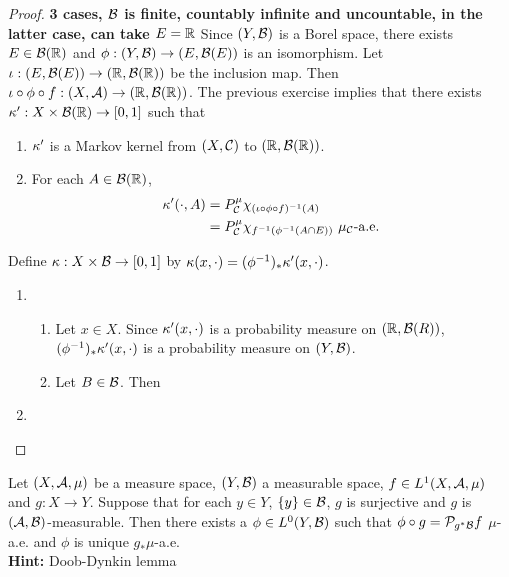 \documentclass{book}
\begin{document}
	\begin{proof} \textbf{3 cases, $\mathcal{B}$ is finite, countably infinite and uncountable, in the latter case, can take $E = \mathbb{R}$}
		Since $(Y, \mathcal{B})$ is a Borel space, there exists $E \in \mathcal{B}(\mathbb{R})$ and $\phi: (Y, \mathcal{B}) \rightarrow (E, \mathcal{B}(E) )$ is an isomorphism. Let $\iota: (E, \mathcal{B}(E)) \rightarrow (\mathbb{R}, \mathcal{B}(\mathbb{R}))$ be the inclusion map. Then $\iota \circ \phi \circ f : (X, \mathcal{A}) \rightarrow (\mathbb{R}, \mathcal{B}(\mathbb{R}))$. The previous exercise implies that there exists $\kappa': X \times \mathcal{B}(\mathbb{R}) \rightarrow [0,1]$ such that  	
		\begin{enumerate}
			\item $\kappa'$ is a Markov kernel from $(X, \mathcal{C})$ to $(\mathbb{R}, \mathcal{B}(\mathbb{R}))$.
			\item For each $A \in \mathcal{B}(\mathbb{R})$,  
			\begin{align*}
				\kappa'(\cdot, A) 
				& = P^{\mu}_{\mathcal{C}}\chi_{(\iota \circ \phi \circ f)^{-1}(A)} \\
				& = P^{\mu}_{\mathcal{C}}\chi_{f^{-1}(\phi^{-1}(A \cap E))} \text{ $\mu_{\mathcal{C}}$-a.e.}\\
			\end{align*}
		\end{enumerate}
		Define $\kappa: X \times \mathcal{B} \rightarrow [0,1]$ by $\kappa(x, \cdot) = (\phi^{-1})_*\kappa'(x, \cdot)$. 
		\begin{enumerate}
			\item
			\begin{enumerate}
				\item  Let $x \in X$. Since $\kappa'(x, \cdot)$ is a probability measure on $(\mathbb{R}, \mathcal{B}(R))$, $(\phi^{-1})_*\kappa'(x, \cdot)$ is a probability measure on $(Y, \mathcal{B})$.
				\item Let $B \in \mathcal{B}$. Then 
			\end{enumerate}
			\item 
		\end{enumerate}
	\end{proof}
	
	\begin{ex} 
		Let $(X, \mathcal{A}, \mu)$ be a measure space, $(Y, \mathcal{B})$ a measurable space, $f \in L^1(X, \mathcal{A}, \mu)$ and $g: X \rightarrow Y$. Suppose that for each $y \in Y$, $\{y\} \in \mathcal{B}$, $g$ is surjective and $g$ is $(\mathcal{A}, \mathcal{B})$-measurable. Then there exists a $\phi \in L^0(Y, \mathcal{B})$ such that $\phi \circ g = \mathcal{P}_{g^*\mathcal{B}}f$ $\mu$-a.e. and $\phi$ is unique $g_*\mu$-a.e. \\
		\textbf{Hint:} Doob-Dynkin lemma
	\end{ex}	
	
\end{document}
